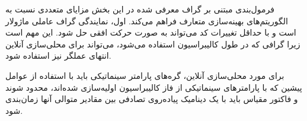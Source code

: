 فرمول‌بندی مبتنی بر گراف معرفی شده در این بخش مزایای متعددی نسبت به الگوریتم‌های بهینه‌سازی متعارف فراهم می‌کند. اول، نمایندگی گراف عاملی ماژولار است و با حداقل تغییرات کد می‌تواند به صورت حرکت افقی حل شود. این مهم است زیرا گرافی که در طول کالیبراسیون استفاده می‌شود، می‌تواند برای محلی‌سازی آنلاین انتهای عملگر نیز استفاده شود.

برای مورد محلی‌سازی آنلاین، گره‌های پارامتر سینماتیکی باید با استفاده از عوامل پیشین که با پارامترهای سینماتیکی از فاز کالیبراسیون اولیه‌سازی شده‌اند، محدود شوند و فاکتور مقیاس باید با یک دینامیک پیاده‌روی تصادفی بین مقادیر متوالی آنها زمان‌بندی شود.







